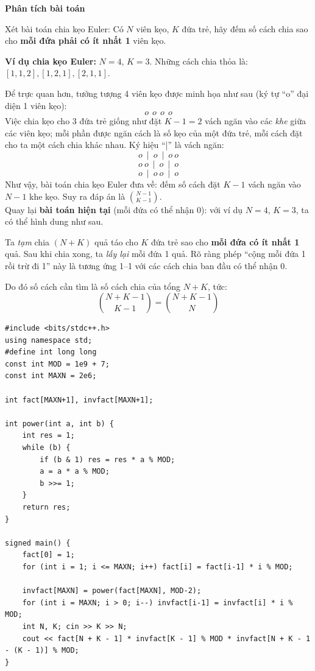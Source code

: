 \textbf{Phân tích bài toán}

Xét bài toán chia kẹo Euler: Có $N$ viên kẹo, $K$ đứa trẻ, hãy đếm số cách chia sao cho \textbf{mỗi đứa phải có ít nhất 1} viên kẹo.

\textbf{Ví dụ chia kẹo Euler:} $N=4$, $K=3$. Những cách chia thỏa là: $[1,1,2], [1,2,1], [2,1,1]$.

Để trực quan hơn, tưởng tượng 4 viên kẹo được minh họa như sau (ký tự ``o'' đại diện 1 viên kẹo):
\[
o\ \ o\ \ o\ \ o
\]
Việc chia kẹo cho 3 đứa trẻ giống như đặt $K-1=2$ vách ngăn vào các \emph{khe} giữa các viên kẹo; mỗi phần được ngăn cách là số kẹo của một đứa trẻ, mỗi cách đặt cho ta một cách chia khác nhau. Ký hiệu ``|'' là vách ngăn:
\[
o\ \mid\ o\ \mid\ o\ o
\]
\[
o\ o\ \mid\ o\ \mid\ o
\]
\[
o\ \mid\ o\ o\ \mid\ o
\]
Như vậy, bài toán chia kẹo Euler đưa về: đếm số cách đặt $K-1$ vách ngăn vào $N-1$ khe kẹo. Suy ra đáp án là $\binom{N-1}{K-1}.$\\

Quay lại \textbf{bài toán hiện tại} (mỗi đứa có thể nhận $0$): với ví dụ $N=4$, $K=3$, ta có thể hình dung như sau.

Ta \emph{tạm} chia $(N+K)$ quả táo cho $K$ đứa trẻ sao cho \textbf{mỗi đứa có ít nhất 1} quả. Sau khi chia xong, ta \emph{lấy lại} mỗi đứa 1 quả. Rõ ràng phép “cộng mỗi đứa 1 rồi trừ đi 1” này là tương ứng 1–1 với các cách chia ban đầu có thể nhận $0$.

Do đó số cách cần tìm là số cách chia của tổng $N+K$, tức:
\[
\binom{N+K-1}{K-1} = \binom{N+K-1}{N}
\]


\begin{lstlisting}[title=\centering \textbf{Cài đặt}]
#include <bits/stdc++.h>
using namespace std;
#define int long long
const int MOD = 1e9 + 7;
const int MAXN = 2e6;

int fact[MAXN+1], invfact[MAXN+1];

int power(int a, int b) {
    int res = 1;
    while (b) {
        if (b & 1) res = res * a % MOD;
        a = a * a % MOD;
        b >>= 1;
    }
    return res;
}

signed main() {
    fact[0] = 1;
    for (int i = 1; i <= MAXN; i++) fact[i] = fact[i-1] * i % MOD;

    invfact[MAXN] = power(fact[MAXN], MOD-2);
    for (int i = MAXN; i > 0; i--) invfact[i-1] = invfact[i] * i % MOD;
    int N, K; cin >> K >> N;
    cout << fact[N + K - 1] * invfact[K - 1] % MOD * invfact[N + K - 1 - (K - 1)] % MOD;
}

\end{lstlisting}

